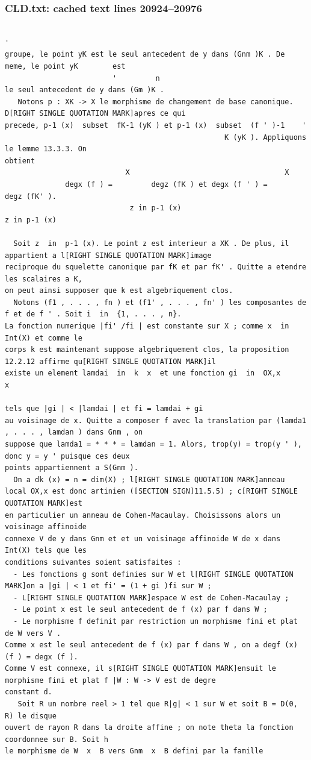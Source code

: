 \documentclass[
  11pt,
]{article}
\begin{document}
\subsubsection{CLD.txt: cached text lines
20924--20976}\label{cld.txt-cached-text-lines-2092420976}

\begin{lstlisting}
                                                                                         '
groupe, le point yK est le seul antecedent de y dans (Gnm )K . De meme, le point yK        est
                         '         n
le seul antecedent de y dans (Gm )K .
   Notons p : XK -> X le morphisme de changement de base canonique. D[RIGHT SINGLE QUOTATION MARK]apres ce qui
precede, p-1 (x)  subset  fK-1 (yK ) et p-1 (x)  subset  (f ' )-1    '
                                                   K (yK ). Appliquons le lemme 13.3.3. On
obtient
                            X                                    X
              degx (f ) =         degz (fK ) et degx (f ' ) =         degz (fK' ).
                             z in p-1 (x)                                  z in p-1 (x)

  Soit z  in  p-1 (x). Le point z est interieur a XK . De plus, il appartient a l[RIGHT SINGLE QUOTATION MARK]image
reciproque du squelette canonique par fK et par fK' . Quitte a etendre les scalaires a K,
on peut ainsi supposer que k est algebriquement clos.
  Notons (f1 , . . . , fn ) et (f1' , . . . , fn' ) les composantes de f et de f ' . Soit i  in  {1, . . . , n}.
La fonction numerique |fi' /fi | est constante sur X ; comme x  in  Int(X) et comme le
corps k est maintenant suppose algebriquement clos, la proposition 12.2.12 affirme qu[RIGHT SINGLE QUOTATION MARK]il
existe un element lamdai  in  k  x  et une fonction gi  in  OX,x             x 
                                                                    tels que |gi | < |lamdai | et fi = lamdai + gi
au voisinage de x. Quitte a composer f avec la translation par (lamda1 , . . . , lamdan ) dans Gnm , on
suppose que lamda1 = * * * = lamdan = 1. Alors, trop(y) = trop(y ' ), donc y = y ' puisque ces deux
points appartiennent a S(Gnm ).
  On a dk (x) = n = dim(X) ; l[RIGHT SINGLE QUOTATION MARK]anneau local OX,x est donc artinien ([SECTION SIGN]11.5.5) ; c[RIGHT SINGLE QUOTATION MARK]est
en particulier un anneau de Cohen-Macaulay. Choisissons alors un voisinage affinoide
connexe V de y dans Gnm et et un voisinage affinoide W de x dans Int(X) tels que les
conditions suivantes soient satisfaites :
  - Les fonctions g sont definies sur W et l[RIGHT SINGLE QUOTATION MARK]on a |gi | < 1 et fi' = (1 + gi )fi sur W ;
  - L[RIGHT SINGLE QUOTATION MARK]espace W est de Cohen-Macaulay ;
  - Le point x est le seul antecedent de f (x) par f dans W ;
  - Le morphisme f definit par restriction un morphisme fini et plat de W vers V .
Comme x est le seul antecedent de f (x) par f dans W , on a degf (x) (f ) = degx (f ).
Comme V est connexe, il s[RIGHT SINGLE QUOTATION MARK]ensuit le morphisme fini et plat f |W : W -> V est de degre
constant d.
   Soit R un nombre reel > 1 tel que R|g| < 1 sur W et soit B = D(0, R) le disque
ouvert de rayon R dans la droite affine ; on note theta la fonction coordonnee sur B. Soit h
le morphisme de W  x  B vers Gnm  x  B defini par la famille


\end{lstlisting}
\end{document}
